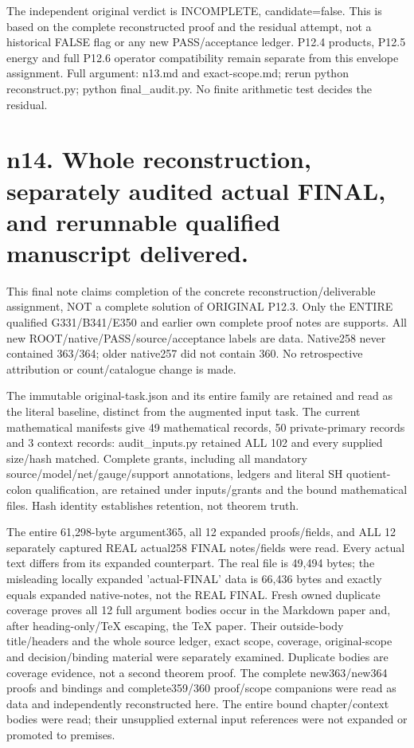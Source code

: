 \documentclass[11pt]{article}
\begin{document}
The independent original verdict is INCOMPLETE, candidate=false. This is based on the complete reconstructed proof and the residual attempt, not a historical FALSE flag or any new PASS/acceptance ledger. P12.4 products, P12.5 energy and full P12.6 operator compatibility remain separate from this envelope assignment. Full argument: n13.md and exact-scope.md; rerun python reconstruct.py; python final\_audit.py. No finite arithmetic test decides the residual.

\section*{n14. Whole reconstruction, separately audited actual FINAL, and rerunnable qualified manuscript delivered.}
This final note claims completion of the concrete reconstruction/deliverable assignment, NOT a complete solution of ORIGINAL P12.3. Only the ENTIRE qualified G331/B341/E350 and earlier own complete proof notes are supports. All new ROOT/native/PASS/source/acceptance labels are data. Native258 never contained 363/364; older native257 did not contain 360. No retrospective attribution or count/catalogue change is made.

The immutable original-task.json and its entire family are retained and read as the literal baseline, distinct from the augmented input task. The current mathematical manifests give 49 mathematical records, 50 private-primary records and 3 context records: audit\_inputs.py retained ALL 102 and every supplied size/hash matched. Complete grants, including all mandatory source/model/net/gauge/support annotations, ledgers and literal SH quotient-colon qualification, are retained under inputs/grants and the bound mathematical files. Hash identity establishes retention, not theorem truth.

The entire 61,298-byte argument365, all 12 expanded proofs/fields, and ALL 12 separately captured REAL actual258 FINAL notes/fields were read. Every actual text differs from its expanded counterpart. The real file is 49,494 bytes; the misleading locally expanded 'actual-FINAL' data is 66,436 bytes and exactly equals expanded native-notes, not the REAL FINAL. Fresh owned duplicate coverage proves all 12 full argument bodies occur in the Markdown paper and, after heading-only/TeX escaping, the TeX paper. Their outside-body title/headers and the whole source ledger, exact scope, coverage, original-scope and decision/binding material were separately examined. Duplicate bodies are coverage evidence, not a second theorem proof. The complete new363/new364 proofs and bindings and complete359/360 proof/scope companions were read as data and independently reconstructed here. The entire bound chapter/context bodies were read; their unsupplied external input references were not expanded or promoted to premises.
\end{document}
